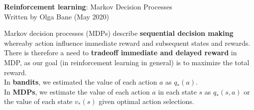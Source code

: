 \documentclass{article}
\begin{document}
\begin{center}{\bf Reinforcement learning}: Markov Decision Processes\\
Written by Olga Bane (May 2020)\end{center}
\vspace*{30pt}
\noindent Markov decision processes (MDPs) describe {\bf sequential decision making} whereaby action influence immediate reward and subsequent states and rewards. There is therefore a need to {\bf tradeoff immediate and delayed reward} in MDP, as our goal (in reinforcement learning in general) is to maximize the total reward. \\

\noindent In {\bf bandits}, we estimated the value of each action $a$ as $q_*(a)$.\\
In {\bf MDPs}, we estimate the value of each action $a$ in each state $s$ as $q_*(s, a)$ or the value of each state $v_*(s)$ given optimal action selections.\\
\end{document}
